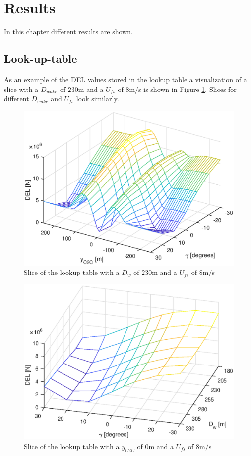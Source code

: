\section{Results}

In this chapter different results are shown.

\subsection{Look-up-table}
As an example of the DEL values stored in the lookup table a visualization of a slice with a $D_{wake}$ of 230m and a $U_{fs}$ of 8m/s is shown in Figure \ref{fig:LUTsliceC2C}. Slices for different $D_{wake}$ and $U_{fs}$ look similarly.

\begin{figure}
	\includegraphics[width=\linewidth]{./Figures/LUTslice_Dw230_Ufs8.eps}
	\caption{Slice of the lookup table with a $D_{w}$ of 230m and a $U_{fs}$ of 8m/s }
	\label{fig:LUTsliceC2C}
\end{figure}

\begin{figure}
	\includegraphics[width=\linewidth]{./Figures/LUTslice_yWake0_Ufs8.eps}
	\caption{Slice of the lookup table with a $y_{C2C}$ of 0m and a $U_{fs}$ of 8m/s }
	\label{fig:LUTsliceDw}
\end{figure}


